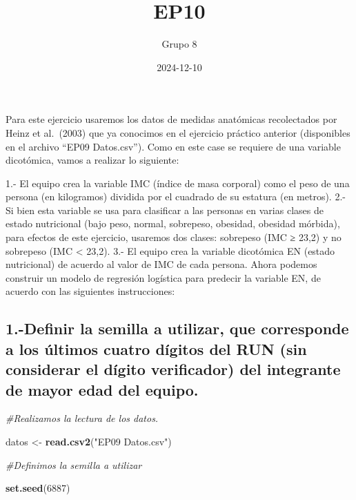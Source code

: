 \documentclass[
]{article}
\title{EP10}
\author{Grupo 8}
\date{2024-12-10}
\newenvironment{Shaded}{\begin{snugshade}}{\end{snugshade}}
\newcommand{\CommentTok}[1]{\textcolor[rgb]{0.56,0.35,0.01}{\textit{#1}}}
\newcommand{\DecValTok}[1]{\textcolor[rgb]{0.00,0.00,0.81}{#1}}
\newcommand{\FunctionTok}[1]{\textcolor[rgb]{0.13,0.29,0.53}{\textbf{#1}}}
\newcommand{\NormalTok}[1]{#1}
\newcommand{\OtherTok}[1]{\textcolor[rgb]{0.56,0.35,0.01}{#1}}
\newcommand{\StringTok}[1]{\textcolor[rgb]{0.31,0.60,0.02}{#1}}
\begin{document}
\maketitle

Para este ejercicio usaremos los datos de medidas anatómicas
recolectados por Heinz et al.~(2003) que ya conocimos en el ejercicio
práctico anterior (disponibles en el archivo ``EP09 Datos.csv''). Como
en este case se requiere de una variable dicotómica, vamos a realizar lo
siguiente:

1.- El equipo crea la variable IMC (índice de masa corporal) como el
peso de una persona (en kilogramos) dividida por el cuadrado de su
estatura (en metros). 2.- Si bien esta variable se usa para clasificar a
las personas en varias clases de estado nutricional (bajo peso, normal,
sobrepeso, obesidad, obesidad mórbida), para efectos de este ejercicio,
usaremos dos clases: sobrepeso (IMC ≥ 23,2) y no sobrepeso (IMC
\textless{} 23,2). 3.- El equipo crea la variable dicotómica EN (estado
nutricional) de acuerdo al valor de IMC de cada persona. Ahora podemos
construir un modelo de regresión logística para predecir la variable EN,
de acuerdo con las siguientes instrucciones:

\subsection{1.-Definir la semilla a utilizar, que corresponde a los
últimos cuatro dígitos del RUN (sin considerar el dígito verificador)
del integrante de mayor edad del
equipo.}\label{definir-la-semilla-a-utilizar-que-corresponde-a-los-uxfaltimos-cuatro-duxedgitos-del-run-sin-considerar-el-duxedgito-verificador-del-integrante-de-mayor-edad-del-equipo.}

\begin{Shaded}
\begin{Highlighting}[]
\CommentTok{\#Realizamos la lectura de los datos.}

\NormalTok{datos }\OtherTok{\textless{}{-}} \FunctionTok{read.csv2}\NormalTok{(}\StringTok{"EP09 Datos.csv"}\NormalTok{)}

\CommentTok{\#Definimos la semilla a utilizar}

\FunctionTok{set.seed}\NormalTok{(}\DecValTok{6887}\NormalTok{)}
\end{Highlighting}
\end{Shaded}
\end{document}
